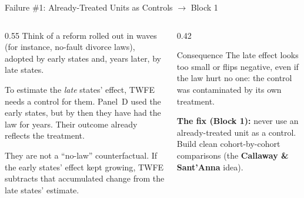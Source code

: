 \documentclass[main.tex]{subfiles}
\begin{document}
\begin{frame}{Failure \#1: Already-Treated Units as Controls \hfill {\small$\rightarrow$ Block 1}}

  \begin{columns}[T]
    \begin{column}{0.55\textwidth}
      Think of a reform rolled out in waves (for instance, no-fault divorce
      laws), adopted by early states and, years later, by late states.

      \medskip
      To estimate the \emph{late} states' effect, TWFE needs a control for them.
      Panel~D used the \alert{early states}, but by then they have had
      the law for years. Their outcome \alert{already reflects the treatment}.

      \medskip
      They are not a ``no-law'' counterfactual. If the early states' effect
      \alert{kept growing}, TWFE subtracts that accumulated change from the
      late states' estimate.
    \end{column}
    \begin{column}{0.42\textwidth}
      \begin{alertblock}{Consequence}
        The late effect looks too small or flips negative, even if the law
        hurt no one: the control was \alert{contaminated by its own treatment}.
      \end{alertblock}

      \medskip
      \textbf{The fix (Block 1):} never use an already-treated unit as a control.
      Build clean \alert{cohort-by-cohort} comparisons (the
      \textbf{Callaway \& Sant'Anna} idea).
    \end{column}
  \end{columns}

\end{frame}
\end{document}
